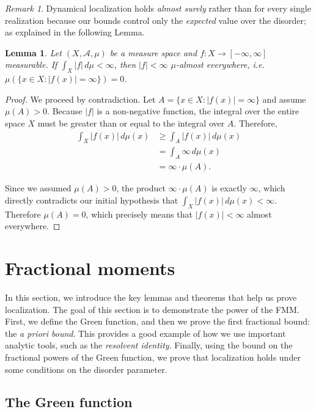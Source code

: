 \documentclass[11pt, a4paper, UKenglish, oneside]{book}
\theoremstyle{plain}
\newtheorem{lemma}[theorem]{Lemma}
\theoremstyle{remark}
\newtheorem{remark}[theorem]{Remark}
\theoremstyle{definition}
\numberwithin{equation}{section}
\numberwithin{theorem}{section}
\begin{document}
\begin{remark}
    Dynamical localization holds \textit{almost surely} rather than for every single realization because our bounds control only the \textit{expected} value over the disorder; as explained in the following Lemma.
\end{remark}
\begin{lemma}\label{lemma:almostsurely}
    Let $(X, \mathcal{A}, \mu)$ be a measure space and $f: X \to [-\infty, \infty]$ measurable. If $\int_X |f| \, d\mu < \infty$, then $|f| < \infty$ $\mu$-almost everywhere, i.e. $\mu(\{x \in X : |f(x)| = \infty\}) = 0$.
\end{lemma}

\begin{proof}
    We proceed by contradiction. Let $A = \{x \in X : |f(x)| = \infty\}$ and assume $\mu(A) > 0$. 
    Because $|f|$ is a non-negative function, the integral over the entire space $X$ must be greater than or equal to the integral over $A$. Therefore, 
    \begin{align*}
        \int_{X} |f(x)| \, d\mu(x) &\ge \int_{A} |f(x)| \, d\mu(x) \\
        &= \int_{A} \infty \, d\mu(x) \\
        &= \infty \cdot \mu(A).
    \end{align*}
    
    Since we assumed $\mu(A) > 0$, the product $\infty \cdot \mu(A)$ is exactly $\infty$, which directly contradicts our initial hypothesis that $\int_{X} |f(x)| \, d\mu(x) < \infty$. 
    Therefore $\mu(A) = 0$, which precisely means that $|f(x)| < \infty$ almost everywhere.
\end{proof}






\clearpage 
\chapter{Fractional moments}
In this section, we introduce the key lemmas and theorems that help us prove localization. The goal of this section is to demonstrate the power of the FMM. First, we define the Green function, and then we prove the first fractional bound: the \textit{a priori bound}. This provides a good example of how we use important analytic tools, such as the \textit{resolvent identity}. Finally, using the bound on the fractional powers of the Green function, we prove that localization holds under some conditions on the disorder parameter.
\section{The Green function}
\end{document}
